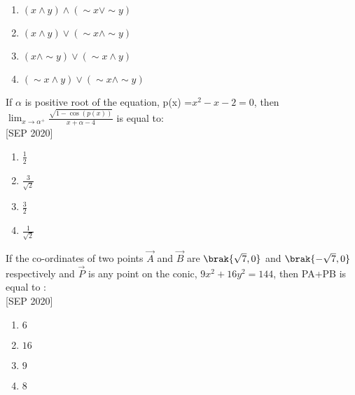     \begin{enumerate}
        \item $(x \land y) \land (\sim x \lor \sim y)$
        \item $(x \land y) \lor (\sim x \land \sim y)$
        \item $(x \land \sim y) \lor (\sim x \land  y)$
        \item $(\sim x \land y) \lor (\sim x \land \sim y)$
    \end{enumerate}
    \item If $\alpha$ is positive root of the equation, p(x) =$x^2-x-2=0$, then $\lim_{x \to \alpha^+} \frac{\sqrt{1 - \cos{(p(x))}}}{x + \alpha - 4}$ is equal to: \\ \hfill{[SEP 2020]}
    \begin{multicols}{4}
    \begin{enumerate}
        \item $\frac{1}{2}$
        \item $\frac{3}{\sqrt{2}}$
        \item $\frac{3}{2}$
        \item $\frac{1}{\sqrt{2}}$
    \end{enumerate} 
    \end{multicols}
    \item If the co-ordinates of two points $\vec{A}$ and $\vec{B}$ are $\brak{\sqrt{7},0}$ and $\brak{-\sqrt{7},0}$respectively and $\vec{P}$ is any point on the conic, $9x^2+16y^2=144$, then PA+PB is equal to : \\\hfill{[SEP 2020]}
    \begin{multicols}{4}
    \begin{enumerate}
        \item $6$
        \item $16$
        \item $9$
        \item $8$
    \end{enumerate} 
    \end{multicols}

